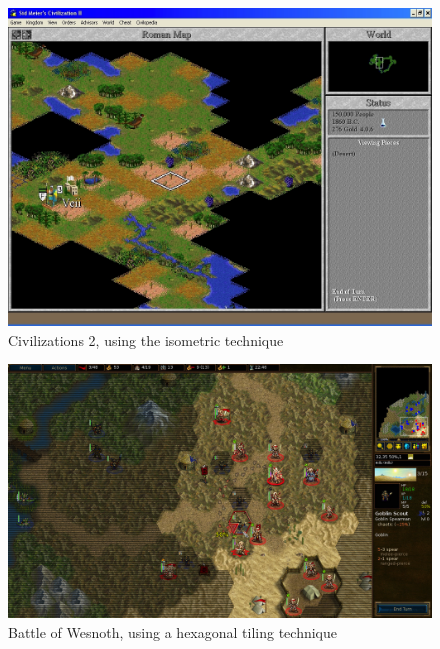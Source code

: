 \begin{figure}[H]
    \centering
    \includegraphics[width=1\textwidth]{figures/generating_levels/civ-2_iso.png}
    \caption{Civilizations 2, using the isometric technique}\label{fig:civ-2_iso} 
\end{figure}

\begin{figure}[H]
    \centering
    \includegraphics[width=1\textwidth]{figures/generating_levels/wesnoth_hex.png}
    \caption{Battle of Wesnoth, using a hexagonal tiling technique}\label{fig:wesnoth_hex} 
\end{figure}

